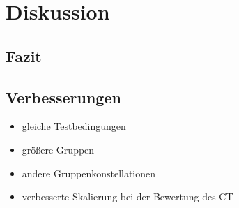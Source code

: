 \chapter{Diskussion}

\section{Fazit}



\section{Verbesserungen}
\begin{itemize}
	\item gleiche Testbedingungen
	\item größere Gruppen
	\item andere Gruppenkonstellationen
	\item verbesserte Skalierung bei der Bewertung des CT
\end{itemize}

